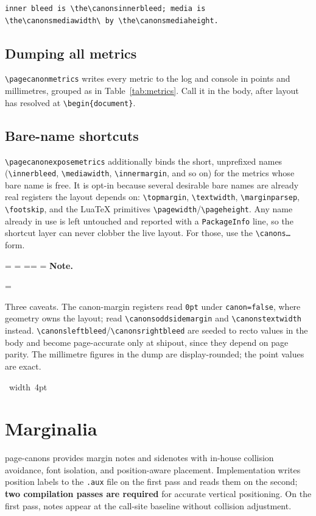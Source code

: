 \documentclass[11pt, twoside, openany]{book}
\makeatletter
\newcommand{\pkg}[1]{\textsf{#1}}
\newcommand{\cmd}[1]{\texttt{\textbackslash #1}}
\newcommand*{\cns@tag@artifact@begin}{}
\newcommand*{\cns@tag@artifact@end}{}
\newenvironment{TodoNote}[1][]{%
  \par\addvspace{0.5\baselineskip plus 2pt}%
  \setbox\cns@box=\vbox\bgroup
    \hsize=\linewidth
    \advance\hsize -10pt
    \linewidth=\hsize \columnwidth=\hsize
    \parindent=\z@
    \noindent\textbf{\sffamily Note\cns@ifnotempty{#1}{ \textmd{(#1)}}.}%
    \par\nobreak
    \@afterindentfalse\@afterheading
    \leftskip=\cns@indent\relax
    \ignorespaces
}{%
  \par
  \egroup
  \vbox{\hbox{%
    \cns@tag@artifact@begin\vrule width 4pt\cns@tag@artifact@end
    \hskip 6pt\relax
    \box\cns@box
  }}%
  \par\addvspace{0.5\baselineskip plus 2pt}%
}
\makeatother
\begin{document}
\begin{verbatim}
inner bleed is \the\canonsinnerbleed; media is
\the\canonsmediawidth\ by \the\canonsmediaheight.
\end{verbatim}

\section{Dumping all metrics}\label{sec:metricdump}

\cmd{pagecanonmetrics} writes every metric to the log and console in points and millimetres, grouped as in Table~\ref{tab:metrics}. Call it in the body, after layout has resolved at \cmd{begin}\texttt{\{document\}}.

\section{Bare-name shortcuts}\label{sec:metricbare}

\cmd{pagecanonexposemetrics} additionally binds the short, unprefixed names (\cmd{innerbleed}, \cmd{mediawidth}, \cmd{innermargin}, and so on) for the metrics whose bare name is free. It is opt-in because several desirable bare names are already real registers the layout depends on: \cmd{topmargin}, \cmd{textwidth}, \cmd{marginparsep}, \cmd{footskip}, and the Lua\TeX{} primitives \cmd{pagewidth}/\cmd{pageheight}. Any name already in use is left untouched and reported with a \texttt{PackageInfo} line, so the shortcut layer can never clobber the live layout. For those, use the \texttt{\textbackslash canons\ldots} form.

\begin{TodoNote}
	Three caveats. The canon-margin registers read \texttt{0pt} under \texttt{canon=false}, where \pkg{geometry} owns the layout; read \cmd{canonsoddsidemargin} and \cmd{canonstextwidth} instead. \cmd{canonsleftbleed}/\cmd{canonsrightbleed} are seeded to recto values in the body and become page-accurate only at shipout, since they depend on page parity. The millimetre figures in the dump are display-rounded; the point values are exact.
\end{TodoNote}

\chapter{Marginalia}\label{chapter:marginalia}

\pkg{page-canons} provides margin notes and sidenotes with in-house collision avoidance, font isolation, and position-aware placement. Implementation writes position labels to the \texttt{.aux} file on the first pass and reads them on the second; \textbf{two compilation passes are required} for accurate vertical positioning. On the first pass, notes appear at the call-site baseline without collision adjustment.
\end{document}
